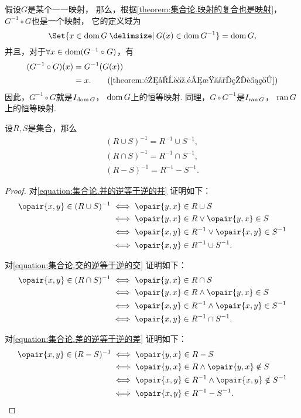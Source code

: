 \begin{example}
假设\(G\)是某个一一映射，
那么，根据\cref{theorem:集合论.映射的复合也是映射}，
\(G^{-1} \circ G\)也是一个映射，
它的定义域为\[
	\Set{ x \in \dom G \given G(x) \in \dom G^{-1} }
	= \dom G,
\]
并且，对于\(\forall x \in \operatorname{dom}(G^{-1} \circ G)\)，有\begin{align*}
	(G^{-1} \circ G)(x) &= G^{-1}(G(x)) \\
	&= x. \tag{\cref{theorem:集合论.逆映射的计算}}
\end{align*}
因此，\(G^{-1} \circ G\)就是\(I_{\operatorname{dom} G}\)，
\(\operatorname{dom} G\)上的恒等映射.
同理，\(G \circ G^{-1}\)是\(I_{\operatorname{ran} G}\)，
\(\operatorname{ran} G\)上的恒等映射.
\end{example}

\begin{theorem}
设\(R,S\)是集合，那么\begin{gather}
	(R \cup S)^{-1} = R^{-1} \cup S^{-1},
	\label{equation:集合论.并的逆等于逆的并} \\
	(R \cap S)^{-1} = R^{-1} \cap S^{-1},
	\label{equation:集合论.交的逆等于逆的交} \\
	(R - S)^{-1} = R^{-1} - S^{-1}.
	\label{equation:集合论.差的逆等于逆的差}
\end{gather}
\begin{proof}
对\cref{equation:集合论.并的逆等于逆的并} 证明如下：
\begin{align*}
	\opair{x,y} \in (R \cup S)^{-1}
	&\iff \opair{y,x} \in R \cup S \\
	&\iff \opair{y,x} \in R \lor \opair{y,x} \in S \\
	&\iff \opair{x,y} \in R^{-1} \lor \opair{x,y} \in S^{-1} \\
	&\iff \opair{x,y} \in R^{-1} \cup S^{-1}.
\end{align*}

对\cref{equation:集合论.交的逆等于逆的交} 证明如下：
\begin{align*}
	\opair{x,y} \in (R \cap S)^{-1}
	&\iff \opair{y,x} \in R \cap S \\
	&\iff \opair{y,x} \in R \land \opair{y,x} \in S \\
	&\iff \opair{x,y} \in R^{-1} \land \opair{x,y} \in S^{-1} \\
	&\iff \opair{x,y} \in R^{-1} \cap S^{-1}.
\end{align*}

对\cref{equation:集合论.差的逆等于逆的差} 证明如下：
\begin{align*}
	\opair{x,y} \in (R - S)^{-1}
	&\iff \opair{y,x} \in R - S \\
	&\iff \opair{y,x} \in R \land \opair{y,x} \notin S \\
	&\iff \opair{x,y} \in R^{-1} \land \opair{x,y} \notin S^{-1} \\
	&\iff \opair{x,y} \in R^{-1} - S^{-1}.
	\qedhere
\end{align*}
\end{proof}
\end{theorem}

